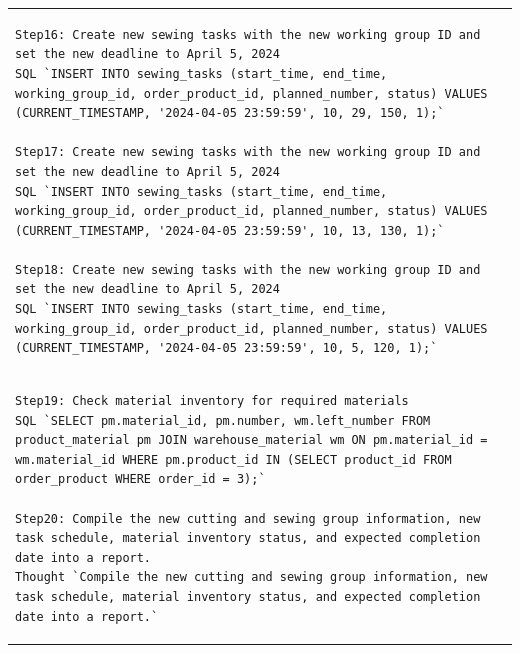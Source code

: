 \documentclass[preprint,12pt]{elsarticle}
\begin{document}
\begin{center}
\begin{longtable}{p{390pt}}
\begin{lstlisting}[style=my_operation, label={lst:chain_of_operation}]
Step16: Create new sewing tasks with the new working group ID and set the new deadline to April 5, 2024
SQL `INSERT INTO sewing_tasks (start_time, end_time, working_group_id, order_product_id, planned_number, status) VALUES (CURRENT_TIMESTAMP, '2024-04-05 23:59:59', 10, 29, 150, 1);`

Step17: Create new sewing tasks with the new working group ID and set the new deadline to April 5, 2024
SQL `INSERT INTO sewing_tasks (start_time, end_time, working_group_id, order_product_id, planned_number, status) VALUES (CURRENT_TIMESTAMP, '2024-04-05 23:59:59', 10, 13, 130, 1);`

Step18: Create new sewing tasks with the new working group ID and set the new deadline to April 5, 2024
SQL `INSERT INTO sewing_tasks (start_time, end_time, working_group_id, order_product_id, planned_number, status) VALUES (CURRENT_TIMESTAMP, '2024-04-05 23:59:59', 10, 5, 120, 1);`
\end{lstlisting}\\ 
\begin{lstlisting}[style=my_operation, label={lst:chain_of_operation}]
Step19: Check material inventory for required materials
SQL `SELECT pm.material_id, pm.number, wm.left_number FROM product_material pm JOIN warehouse_material wm ON pm.material_id = wm.material_id WHERE pm.product_id IN (SELECT product_id FROM order_product WHERE order_id = 3);`

Step20: Compile the new cutting and sewing group information, new task schedule, material inventory status, and expected completion date into a report.
Thought `Compile the new cutting and sewing group information, new task schedule, material inventory status, and expected completion date into a report.`
\end{lstlisting}\\ \hline
\end{longtable}
\end{center}









\end{document}
